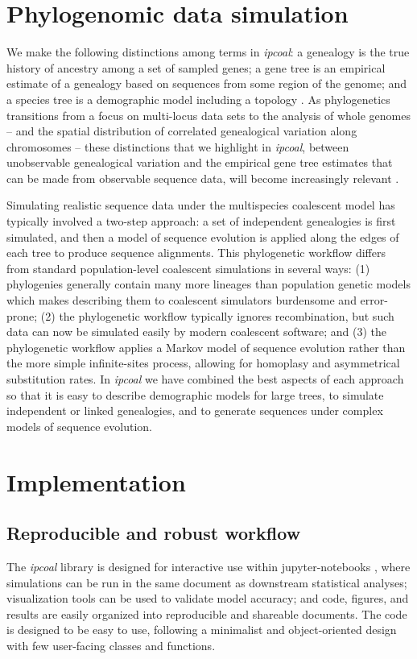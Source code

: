 \documentclass[11pt]{article}
\begin{document}
\section{Phylogenomic data simulation}
We make the following distinctions among terms in \emph{ipcoal}: a genealogy is the true history of ancestry among a set of sampled genes; a gene tree is an empirical estimate of a genealogy based on sequences from some region of the genome; and a species tree is a demographic model including a topology \citep{maddison_gene_1997,pamilo_relationships_1988}. As phylogenetics transitions from a focus on multi-locus data sets \citep{knowles_estimating_2011} to the analysis of whole genomes -- and the spatial distribution of correlated genealogical variation along chromosomes -- these distinctions that we highlight in \emph{ipcoal}, between unobservable genealogical variation and the empirical gene tree estimates that can be made from observable sequence data, will become increasingly relevant \citep{adams_binning_2019,posada_recombination_2002}. 

Simulating realistic sequence data under the multispecies coalescent model has typically involved a two-step approach: a set of independent genealogies is first simulated, and then a model of sequence evolution is applied along the edges of each tree to produce sequence alignments. This phylogenetic workflow differs from standard population-level coalescent simulations in several ways: (1) phylogenies generally contain many more lineages than population genetic models which makes describing them to coalescent simulators burdensome and error-prone; (2) the phylogenetic workflow typically ignores recombination, but such data can now be simulated easily by modern coalescent software; and (3) the phylogenetic workflow applies a Markov model of sequence evolution rather than the more simple infinite-sites process, allowing for homoplasy and asymmetrical substitution rates. In \emph{ipcoal} we have combined the best aspects of each approach so that it is easy to describe demographic models for large trees, to simulate independent or linked genealogies, and to generate sequences under complex models of sequence evolution. 

\section{Implementation}
\label{sec:headings}
\subsection{Reproducible and robust workflow}
The \emph{ipcoal} library is designed for interactive use within jupyter-notebooks \citep{kluyver_jupyter_2016}, where simulations can be run in the same document as downstream statistical analyses; visualization tools can be used to validate model accuracy; and code, figures, and results are easily organized into reproducible and shareable documents. The code is designed to be easy to use, following a minimalist and object-oriented design with few user-facing classes and functions.
\end{document}
